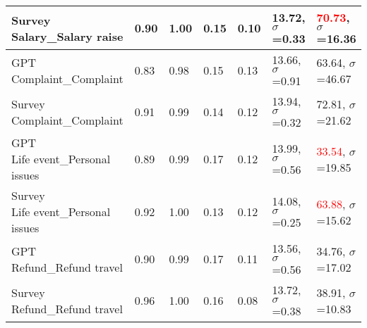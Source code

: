 \begin{table}[]
{\begin{tabular}{|l|l|l|l|l|l|l|}
    \shortstack[l]{Survey\\Salary\_Salary raise}                                      & 0.90                          & 1.00                         & 0.15                              & 0.10                              & 13.72, $\sigma$=0.33              & \textcolor{red}{70.73}, $\sigma$=16.36    \\ \hline
    \shortstack[l]{GPT\\Complaint\_Complaint}                                         & 0.83                          & 0.98                         & 0.15                              & 0.13                              & 13.66, $\sigma$=0.91              & 63.64, $\sigma$=46.67    \\ \hline
    \shortstack[l]{Survey\\Complaint\_Complaint}                                      & 0.91                          & 0.99                         & 0.14                              & 0.12                              & 13.94, $\sigma$=0.32              & 72.81, $\sigma$=21.62    \\ \hline
    \shortstack[l]{GPT\\Life event\_Personal issues}                                  & 0.89                          & 0.99                         & 0.17                              & 0.12                              & 13.99, $\sigma$=0.56              & \textcolor{red}{33.54}, $\sigma$=19.85    \\ \hline
    \shortstack[l]{Survey\\Life event\_Personal issues}                               & 0.92                          & 1.00                         & 0.13                              & 0.12                              & 14.08, $\sigma$=0.25              & \textcolor{red}{63.88}, $\sigma$=15.62    \\ \hline
    \shortstack[l]{GPT\\Refund\_Refund travel}                                        & 0.90                          & 0.99                         & 0.17                              & 0.11                              & 13.56, $\sigma$=0.56              & 34.76, $\sigma$=17.02    \\ \hline
    \shortstack[l]{Survey\\Refund\_Refund travel}                                     & 0.96                          & 1.00                         & 0.16                              & 0.08                              & 13.72, $\sigma$=0.38              & 38.91, $\sigma$=10.83    \\ \hline

\end{tabular}}
\end{table}
